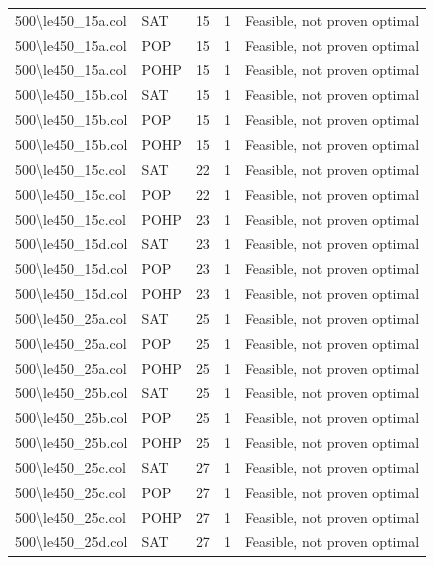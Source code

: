 \begin{longtable}{llrrl}
500\textbackslash{}le450\_15a.col & SAT & 15 & 1 & Feasible, not proven optimal \\
500\textbackslash{}le450\_15a.col & POP & 15 & 1 & Feasible, not proven optimal \\
500\textbackslash{}le450\_15a.col & POHP & 15 & 1 & Feasible, not proven optimal \\
500\textbackslash{}le450\_15b.col & SAT & 15 & 1 & Feasible, not proven optimal \\
500\textbackslash{}le450\_15b.col & POP & 15 & 1 & Feasible, not proven optimal \\
500\textbackslash{}le450\_15b.col & POHP & 15 & 1 & Feasible, not proven optimal \\
500\textbackslash{}le450\_15c.col & SAT & 22 & 1 & Feasible, not proven optimal \\
500\textbackslash{}le450\_15c.col & POP & 22 & 1 & Feasible, not proven optimal \\
500\textbackslash{}le450\_15c.col & POHP & 23 & 1 & Feasible, not proven optimal \\
500\textbackslash{}le450\_15d.col & SAT & 23 & 1 & Feasible, not proven optimal \\
500\textbackslash{}le450\_15d.col & POP & 23 & 1 & Feasible, not proven optimal \\
500\textbackslash{}le450\_15d.col & POHP & 23 & 1 & Feasible, not proven optimal \\
500\textbackslash{}le450\_25a.col & SAT & 25 & 1 & Feasible, not proven optimal \\
500\textbackslash{}le450\_25a.col & POP & 25 & 1 & Feasible, not proven optimal \\
500\textbackslash{}le450\_25a.col & POHP & 25 & 1 & Feasible, not proven optimal \\
500\textbackslash{}le450\_25b.col & SAT & 25 & 1 & Feasible, not proven optimal \\
500\textbackslash{}le450\_25b.col & POP & 25 & 1 & Feasible, not proven optimal \\
500\textbackslash{}le450\_25b.col & POHP & 25 & 1 & Feasible, not proven optimal \\
500\textbackslash{}le450\_25c.col & SAT & 27 & 1 & Feasible, not proven optimal \\
500\textbackslash{}le450\_25c.col & POP & 27 & 1 & Feasible, not proven optimal \\
500\textbackslash{}le450\_25c.col & POHP & 27 & 1 & Feasible, not proven optimal \\
500\textbackslash{}le450\_25d.col & SAT & 27 & 1 & Feasible, not proven optimal \\

\end{longtable}
